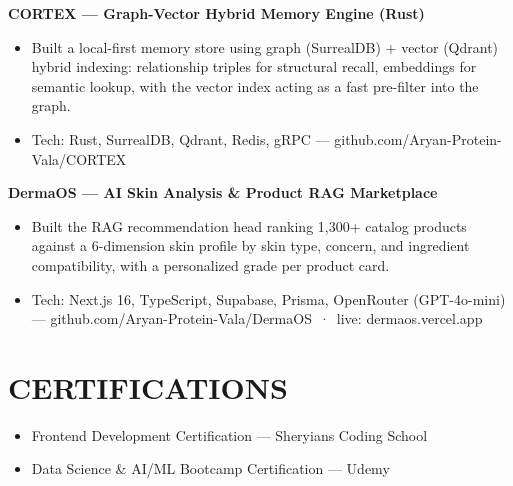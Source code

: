 \documentclass[9pt]{article}
\begin{document}
\textbf{CORTEX  ---  Graph-Vector Hybrid Memory Engine (Rust)}
\vspace{1pt}
\begin{itemize}[leftmargin=11pt,itemsep=0pt,topsep=1pt,parsep=0pt]
\item Built a local-first memory store using graph (SurrealDB) + vector (Qdrant) hybrid indexing: relationship triples for structural recall, embeddings for semantic lookup, with the vector index acting as a fast pre-filter into the graph.
\item Tech: Rust, SurrealDB, Qdrant, Redis, gRPC  ---  github.com/Aryan-Protein-Vala/CORTEX
\end{itemize}
\textbf{DermaOS  ---  AI Skin Analysis \& Product RAG Marketplace}
\vspace{1pt}
\begin{itemize}[leftmargin=11pt,itemsep=0pt,topsep=1pt,parsep=0pt]
\item Built the RAG recommendation head ranking 1,300+ catalog products against a 6-dimension skin profile by skin type, concern, and ingredient compatibility, with a personalized grade per product card.
\item Tech: Next.js 16, TypeScript, Supabase, Prisma, OpenRouter (GPT-4o-mini)  ---  github.com/Aryan-Protein-Vala/DermaOS \,·\, live: dermaos.vercel.app
\end{itemize}
\section*{CERTIFICATIONS}
\begin{itemize}[leftmargin=11pt,itemsep=0pt,topsep=1pt,parsep=0pt]
\item Frontend Development Certification  ---  Sheryians Coding School
\item Data Science \& AI/ML Bootcamp Certification  ---  Udemy
\end{itemize}
\end{document}

